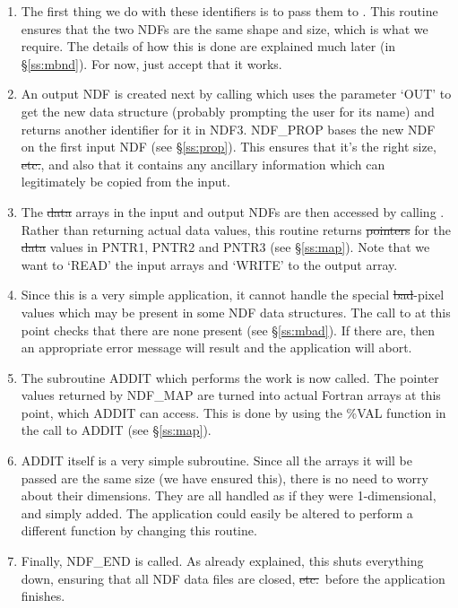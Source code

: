 \begin{enumerate}
\item The first thing we do with these identifiers is to pass them to
. 
This routine ensures that the two NDFs are the same shape and size, which is 
what we require.
The details of how this is done are explained much later (in
\S\ref{ss:mbnd}). 
For now, just accept that it works. 

\item An output NDF is created next by calling  which uses the
parameter `OUT' to get the new data structure (probably prompting the
user for its name) and returns another identifier for it in NDF3. 
NDF\_PROP bases the new NDF on the first input NDF (see \S\ref{ss:prop}).
This ensures that it's the right size, \st{etc.}, and also that it contains
any ancillary information which can legitimately be copied from the input. 

\item The \st{data\/} arrays in the input and output NDFs are then accessed
by calling . 
Rather than returning actual data values, this routine returns
\st{pointers\/} for the \st{data\/} values in PNTR1, PNTR2 and PNTR3
(see 
\S\ref{ss:map}). 
Note that we want to `READ' the input arrays and `WRITE' to the output array.

\item Since this is a very simple application, it cannot handle the special
\st{bad\/}-pixel values which may be present in some NDF data structures. 
The call to  at this point checks that there are none present (see 
\S\ref{ss:mbad}).
If there are, then an appropriate error message will result and the application
will abort. 

\item The subroutine ADDIT which performs the work is now called. 
The pointer values returned by NDF\_MAP are turned into actual Fortran
arrays at this point, which ADDIT can access. 
This is done by using the \%VAL function in the call to ADDIT (see
\S\ref{ss:map}). 

\item ADDIT itself is a very simple subroutine.
Since all the arrays it will be passed are the same size (we have ensured 
this), there is no need to worry about their dimensions.
They are all handled as if they were 1-dimensional, and simply added.
The application could easily be altered to perform a different function by
changing this routine.

\item Finally, NDF\_END is called.
As already explained, this shuts everything down, ensuring that all NDF data
files are closed, \st{etc.}\ before the application finishes. 

\end{enumerate}



